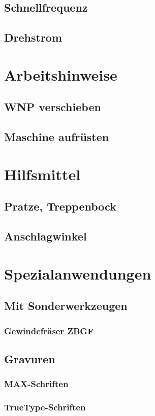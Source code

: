 \documentclass[a5paper]{book}
\begin{document}
		\subsection{Schnellfrequenz} 
		\subsection{Drehstrom} 	 
	\section{Arbeitshinweise}
		\subsection{WNP verschieben} 
		\subsection{Maschine aufrüsten}
	\section{Hilfsmittel} 
		\subsection{Pratze, Treppenbock} 
		\subsection{Anschlagwinkel} 		 
	\section{Spezialanwendungen} 
		\subsection{Mit Sonderwerkzeugen}
			\subsubsection{Gewindefräser ZBGF} 
		\subsection{Gravuren} 
			\subsubsection{MAX-Schriften} 
			\subsubsection{TrueType-Schriften} 
\end{document}
